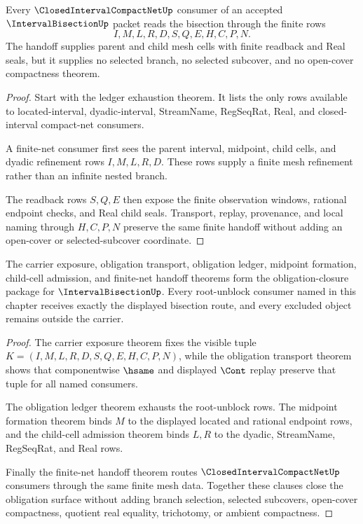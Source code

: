 \begin{theorem}
\label{thm:interval-bisection-finite-net-handoff}
Every $\ClosedIntervalCompactNetUp$ consumer of an accepted $\IntervalBisectionUp$ packet reads the bisection through the finite rows
$$
I,M,L,R,D,S,Q,E,H,C,P,N.
$$
The handoff supplies parent and child mesh cells with finite readback and Real seals, but it supplies no selected branch, no selected subcover, and no open-cover compactness theorem.
\end{theorem}
\begin{proof}
Start with the ledger exhaustion theorem. It lists the only rows available to located-interval, dyadic-interval, StreamName, RegSeqRat, Real, and closed-interval compact-net consumers.

A finite-net consumer first sees the parent interval, midpoint, child cells, and dyadic refinement rows $I,M,L,R,D$. These rows supply a finite mesh refinement rather than an infinite nested branch.

The readback rows $S,Q,E$ then expose the finite observation windows, rational endpoint checks, and Real child seals. Transport, replay, provenance, and local naming through $H,C,P,N$ preserve the same finite handoff without adding an open-cover or selected-subcover coordinate.
\end{proof}

\begin{theorem}
\label{thm:interval-bisection-obligation-closure-package}
The carrier exposure, obligation transport, obligation ledger, midpoint formation, child-cell admission, and finite-net handoff theorems form the obligation-closure package for $\IntervalBisectionUp$. Every root-unblock consumer named in this chapter receives exactly the displayed bisection route, and every excluded object remains outside the carrier.
\end{theorem}
\begin{proof}
The carrier exposure theorem fixes the visible tuple $K=(I,M,L,R,D,S,Q,E,H,C,P,N)$, while the obligation transport theorem shows that componentwise $\hsame$ and displayed $\Cont$ replay preserve that tuple for all named consumers.

The obligation ledger theorem exhausts the root-unblock rows. The midpoint formation theorem binds $M$ to the displayed located and rational endpoint rows, and the child-cell admission theorem binds $L,R$ to the dyadic, StreamName, RegSeqRat, and Real rows.

Finally the finite-net handoff theorem routes $\ClosedIntervalCompactNetUp$ consumers through the same finite mesh data. Together these clauses close the obligation surface without adding branch selection, selected subcovers, open-cover compactness, quotient real equality, trichotomy, or ambient compactness.
\end{proof}

